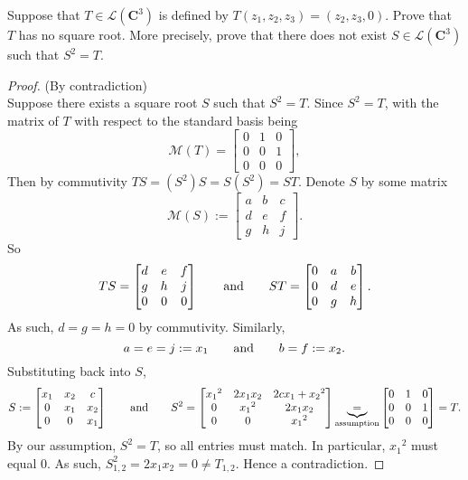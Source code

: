 Suppose that $T \in \mathcal{L}(\mathbf{C}^3)$ is defined by $T(z_1,z_2,z_3) = (z_2,z_3,0)$. Prove that $T$ has no square root.  More precisely, prove that there does not exist $S \in \mathcal{L}(\mathbf{C}^3)$ such that $S^2 = T$.

\begin{proof} (By contradiction)\\
    Suppose there exists a square root $S$ such that $S^2 = T$. Since $S^2 = T$, with the matrix of $T$ with respect to the standard basis being
    $$\mathcal M (T) = \begin{bmatrix}
        0 & 1 & 0 \\
        0 & 0 & 1 \\
        0 & 0 & 0 
    \end{bmatrix},$$
    Then by commutivity $TS = (S^2)S = S(S^2) = ST$. Denote $S$ by some matrix 
    $$\mathcal{M}(S) := \begin{bmatrix}
        a & b & c \\ d & e & f \\ g & h & j
    \end{bmatrix}.$$
    So 
    $$TS = \begin{bmatrix}
        d & e & f \\ g & h & j \\ 0 & 0 & 0
    \end{bmatrix} \qquad \text{and} \qquad ST = \begin{bmatrix}
        0 & a & b \\ 0 & d & e \\ 0 & g & h
    \end{bmatrix}.$$
    As such, $d = g = h = 0$ by commutivity. Similarly, $$a = e = j := x_1 \qquad \text{and} \qquad b = f := x_2.$$
    Substituting back into $S$,
    $$S := \begin{bmatrix}
        x_1 & x_2 & c \\ 0 & x_1 & x_2\\ 0 & 0 & x_1
    \end{bmatrix} \qquad \text{and} \qquad S^2 = \begin{bmatrix}
        {x_1}^2 & 2x_1x_2 & 2cx_1 + {x_2}^2 \\ 0 & {x_1}^2 & 2x_1x_2 \\ 0 & 0 & {x_1}^2
    \end{bmatrix} \underbrace{=}_{\text{assumption}} \begin{bmatrix}
        0 & 1 & 0 \\
        0 & 0 & 1 \\
        0 & 0 & 0 
    \end{bmatrix} = T.$$
    By our assumption, $S^2 = T$, so all entries must match. In particular, ${x_1}^2$ must equal 0. As such, $S^2_{1,2} = 2x_1x_2 = 0 \neq T_{1,2}$. Hence a contradiction. 
\end{proof}